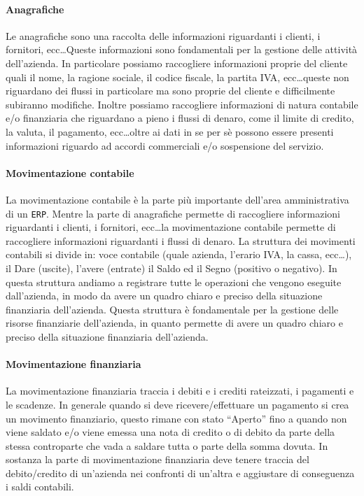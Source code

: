     \paragraph{Anagrafiche} Le anagrafiche sono una raccolta delle informazioni riguardanti i clienti, i fornitori, ecc\dots Queste informazioni sono fondamentali per la gestione delle attività dell'azienda. In particolare possiamo raccogliere informazioni proprie del cliente quali il nome, la ragione sociale, il codice fiscale, la partita IVA, ecc\dots queste non riguardano dei flussi in particolare ma sono proprie del cliente e difficilmente subiranno modifiche. Inoltre possiamo raccogliere informazioni di natura contabile e/o finanziaria che riguardano a pieno i flussi di denaro, come il limite di credito, la valuta, il pagamento, ecc\dots oltre ai dati in se per sè possono essere presenti informazioni riguardo ad accordi commerciali e/o sospensione del servizio.
    \paragraph{Movimentazione contabile} La movimentazione contabile è la parte più importante dell'area amministrativa di un \texttt{ERP}. Mentre la parte di anagrafiche permette di raccogliere informazioni riguardanti i clienti, i fornitori, ecc\dots la movimentazione contabile permette di raccogliere informazioni riguardanti i flussi di denaro. La struttura dei movimenti contabili si divide in: voce contabile (quale azienda, l'erario IVA, la cassa, ecc\dots), il Dare (uscite), l'avere (entrate) il Saldo ed il Segno (positivo o negativo). In questa struttura andiamo a registrare tutte le operazioni che vengono eseguite dall'azienda, in modo da avere un quadro chiaro e preciso della situazione finanziaria dell'azienda. Questa struttura è fondamentale per la gestione delle risorse finanziarie dell'azienda, in quanto permette di avere un quadro chiaro e preciso della situazione finanziaria dell'azienda. 
    \paragraph{Movimentazione finanziaria} La movimentazione finanziaria traccia i debiti e i crediti rateizzati, i pagamenti e le scadenze. In generale quando si deve ricevere/effettuare un pagamento si crea un movimento finanziario, questo rimane con stato ``Aperto'' fino a quando non viene saldato e/o viene emessa una nota di credito o di debito da parte della stessa controparte che vada a saldare tutta o parte della somma dovuta. In sostanza la parte di movimentazione finanziaria deve tenere traccia del debito/credito di un'azienda nei confronti di un'altra e aggiustare di conseguenza i saldi contabili.
